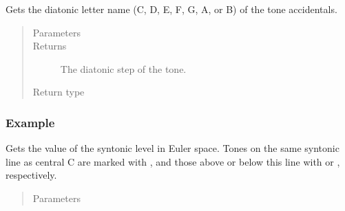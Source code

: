 \documentclass[letterpaper,10pt,english]{sphinxmanual}
\begin{document}
\begin{fulllineitems}
\begin{fulllineitems}
\label{\detokenize{api:musictheory.Tone.get_step}}
Gets the diatonic letter name (C, D, E, F, G, A, or B) of the tone  accidentals.
\begin{quote}\begin{description}
\item[{Parameters}] \leavevmode
{} \textendash{} 

\item[{Returns}] \leavevmode
The diatonic step of the tone.

\item[{Return type}] \leavevmode
{}

\end{description}\end{quote}
\subsubsection*{Example}

\begin{sphinxVerbatim}[commandchars=\\\{\}]
   
\end{sphinxVerbatim}

\end{fulllineitems}


\begin{fulllineitems}
\label{\detokenize{api:musictheory.Tone.get_syntonic}}
Gets the value of the syntonic level in Euler space.
Tones on the same syntonic line as central C are marked with \sphinxtitleref{\_},
and those above or below this line with  or \sphinxtitleref{,}, respectively.
\begin{quote}\begin{description}
\item[{Parameters}] \leavevmode
{} \textendash{} 


\end{description}
\end{quote}
\end{fulllineitems}
\end{fulllineitems}
\end{document}
